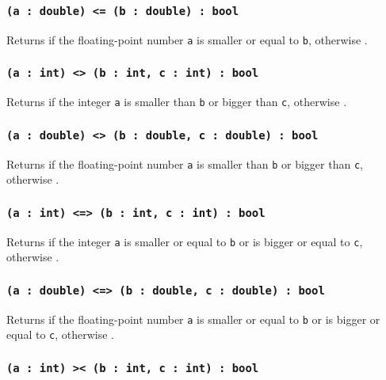 \subsubsection{\texttt{(a : double) <= (b : double) : bool}}

Returns \true{} if the floating-point number \texttt{a} is smaller or equal to \texttt{b}, otherwise \false{}.

\subsubsection{\texttt{(a : int) <> (b : int, c : int) : bool}}

Returns \true{} if the integer \texttt{a} is smaller than \texttt{b} or bigger than \texttt{c}, otherwise \false{}.

\subsubsection{\texttt{(a : double) <> (b : double, c : double) : bool}}

Returns \true{} if the floating-point number \texttt{a} is smaller than \texttt{b} or bigger than \texttt{c}, otherwise \false{}.

\subsubsection{\texttt{(a : int) <=> (b : int, c : int) : bool}}

Returns \true{} if the integer \texttt{a} is smaller or equal to \texttt{b} or is bigger or equal to \texttt{c}, otherwise \false{}.

\subsubsection{\texttt{(a : double) <=> (b : double, c : double) : bool}}

Returns \true{} if the floating-point number \texttt{a} is smaller or equal to \texttt{b} or is bigger or equal to \texttt{c}, otherwise \false{}.

\subsubsection{\texttt{(a : int) >< (b : int, c : int) : bool}}

